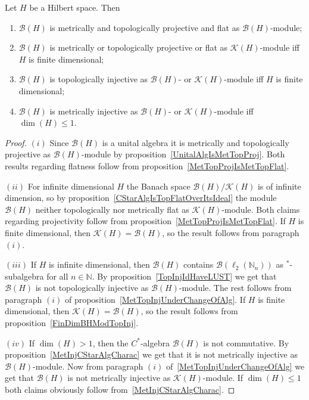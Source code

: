 \begin{proposition}\label{KHAndBHModBH} Let $H$ be a Hilbert space. Then

\begin{enumerate}[label = (\roman*)]
    \item $\mathcal{B}(H)$ is metrically and topologically projective and 
    flat as $\mathcal{B}(H)$-module;

    \item $\mathcal{B}(H)$ is metrically or topologically projective or flat as
    $\mathcal{K}(H)$-module iff $H$ is finite dimensional;

    \item $\mathcal{B}(H)$ is topologically injective as $\mathcal{B}(H)$- or
    $\mathcal{K}(H)$-module iff $H$ is finite dimensional;

    \item $\mathcal{B}(H)$ is metrically injective as $\mathcal{B}(H)$- or
    $\mathcal{K}(H)$-module iff $\dim(H)\leq 1$.
\end{enumerate}
\end{proposition}
\begin{proof} $(i)$ Since $\mathcal{B}(H)$ is a unital algebra it is metrically
and topologically projective as $\mathcal{B}(H)$-module by
proposition~\ref{UnitalAlgIsMetTopProj}. Both results regarding flatness follow
from proposition~\ref{MetTopProjIsMetTopFlat}.

$(ii)$ For infinite dimensional $H$ the Banach space
$\mathcal{B}(H)/\mathcal{K}(H)$ is of infinite dimension, so by
proposition~\ref{CStarAlgIsTopFlatOverItsIdeal} the module $\mathcal{B}(H)$
neither topologically nor metrically flat as $\mathcal{K}(H)$-module. Both
claims regarding projectivity follow from
proposition~\ref{MetTopProjIsMetTopFlat}. If $H$ is finite dimensional, then
$\mathcal{K}(H)=\mathcal{B}(H)$, so the result follows from paragraph $(i)$.

$(iii)$ If $H$ is infinite dimensional, then $\mathcal{B}(H)$ contains
$\mathcal{B}(\ell_2(\mathbb{N}_n))$ as ${}^*$-subalgebra for all
$n\in\mathbb{N}$. By proposition~\ref{TopInjIdHaveLUST} we get that
$\mathcal{B}(H)$ is not topologically injective as $\mathcal{B}(H)$-module. The
rest follows from paragraph $(i)$ of
proposition~\ref{MetTopInjUnderChangeOfAlg}. If $H$ is finite dimensional, then
$\mathcal{K}(H)=\mathcal{B}(H)$, so the result follows from
proposition~\ref{FinDimBHModTopInj}.

$(iv)$ If $\dim(H)>1$, then the $C^*$-algebra $\mathcal{B}(H)$ is not commutative. 
By proposition~\ref{MetInjCStarAlgCharac} we get that it is not metrically
injective as $\mathcal{B}(H)$-module. Now from paragraph $(i)$
of~\ref{MetTopInjUnderChangeOfAlg} we get that $\mathcal{B}(H)$ is not
metrically injective as $\mathcal{K}(H)$-module. If $\dim(H)\leq 1$ both claims
obviously follow from~\ref{MetInjCStarAlgCharac}.
\end{proof}

